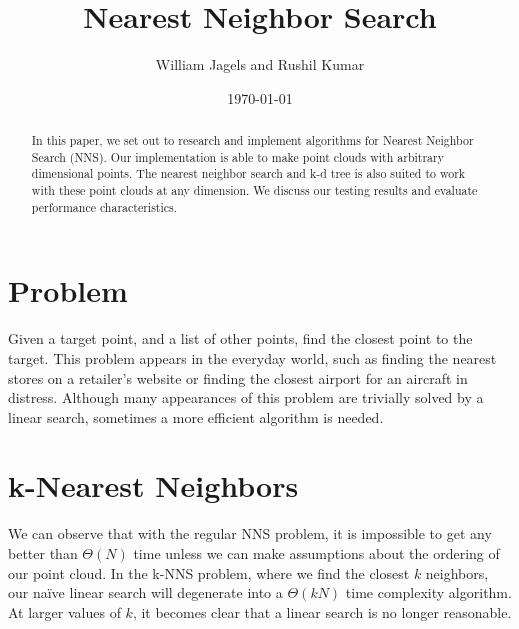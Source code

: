 \documentclass[a4paper,12pt]{article}
\title{Nearest Neighbor Search}
\author{William Jagels and Rushil Kumar}
\date{\today}
\begin{document}
\maketitle

\begin{abstract}
  In this paper, we set out to research and implement algorithms for Nearest Neighbor Search (NNS).
  Our implementation is able to make point clouds with arbitrary dimensional points.
  The nearest neighbor search and k-d tree is also suited to work with these point clouds
  at any dimension.
  We discuss our testing results and evaluate performance characteristics.
\end{abstract}

\section{Problem}
Given a target point, and a list of other points, find the closest point to the target.
This problem appears in the everyday world, such as finding the nearest stores on a
retailer's website or finding the closest airport for an aircraft in distress.
Although many appearances of this problem are trivially solved by a linear search,
sometimes a more efficient algorithm is needed.

\section{k-Nearest Neighbors}
We can observe that with the regular NNS problem, it is impossible to get any better than
$\Theta(N)$ time unless we can make assumptions about the ordering of our point cloud.
In the k-NNS problem, where we find the closest $k$ neighbors, our naïve linear search
will degenerate into a $\Theta(kN)$ time complexity algorithm.
At larger values of $k$, it becomes clear that a linear search is no longer reasonable.
\end{document}
